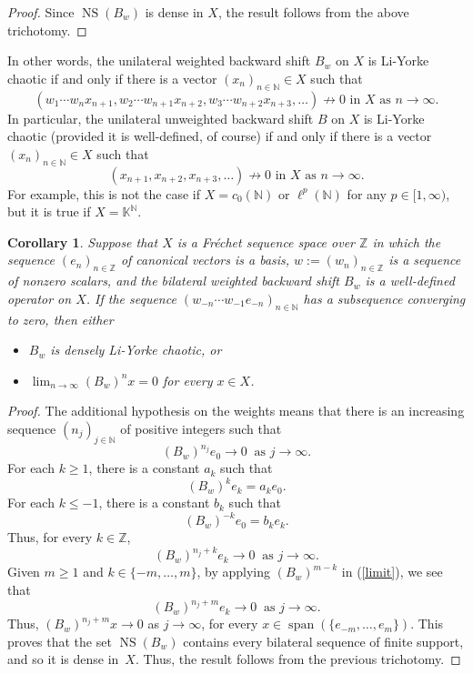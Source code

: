 \documentclass[12pt]{amsart}
\theoremstyle{theorem}
\newtheorem{corollary}[theorem]{Corollary}
\theoremstyle{definition}
\theoremstyle{remark} \theoremstyle{question} \theoremstyle{example}
\newcommand{\N}{\mathbb{N}}
\newcommand{\Z}{\mathbb{Z}}
\newcommand{\K}{\mathbb{K}}
\newcommand{\spa}{\operatorname{span}}
\newcommand{\NS}{\operatorname{NS}}
\begin{document}
\begin{proof}
Since $\NS(B_w)$ is dense in $X$, the result follows from the above trichotomy.
\end{proof}

In other words, the unilateral weighted backward shift $B_w$ on $X$ is Li-Yorke chaotic
if and only if there is a vector $(x_n)_{n \in \N} \in X$ such that
\[
(w_1 \cdots w_n x_{n+1},w_2 \cdots w_{n+1} x_{n+2},w_3 \cdots w_{n+2} x_{n+3},\ldots) \not\to 0 \text{ in } X \text{ as } n \to \infty.
\]
In particular, the unilateral unweighted backward shift $B$ on $X$ is Li-Yorke chaotic (provided it is well-defined, of course)
if and only if there is a vector $(x_n)_{n \in \N} \in X$ such that
\[
(x_{n+1},x_{n+2},x_{n+3},\ldots) \not\to 0 \text{ in } X \text{ as } n \to \infty.
\]
For example, this is not the case if $X = c_0(\N)$ or $\ell^p(\N)$ for any $p \in [1,\infty)$, but it is true if $X = \K^\N$.

\begin{corollary}\label{BWBS}
Suppose that $X$ is a Fr\'echet sequence space over $\Z$ in which the sequence $(e_n)_{n \in \Z}$ of canonical vectors is a basis,
$w\!:= (w_n)_{n \in \Z}$ is a sequence of nonzero scalars, and the bilateral weighted backward shift $B_w$ is a well-defined 
operator on $X$. If the sequence $(w_{-n} \cdots w_{-1} e_{-n})_{n \in \N}$ has a subsequence converging to zero, then either
\begin{itemize}
\item [\rm (a)] $B_w$ is densely Li-Yorke chaotic, or
\item [\rm (b)] $\displaystyle \lim_{n \to \infty} (B_w)^n x = 0$ for every $x \in X$.
\end{itemize}
\end{corollary}

\begin{proof}
The additional hypothesis on the weights means that there is an increasing sequence $(n_j)_{j \in \N}$ of positive integers such that
\[
(B_w)^{n_j}e_0 \to 0 \ \text{ as } j \to \infty.
\]
For each $k \geq 1$, there is a constant $a_k$ such that
\[
(B_w)^k e_k = a_k e_0.
\]
For each $k \leq -1$, there is a constant $b_k$ such that
\[
(B_w)^{-k} e_0 = b_k e_k.
\]
Thus, for every $k \in \Z$,
\begin{equation}
(B_w)^{n_j + k} e_k \to 0 \ \text{ as } j \to \infty.\label{limit}
\end{equation}
Given $m \geq 1$ and $k \in \{-m,\ldots,m\}$, by applying $(B_w)^{m-k}$ in (\ref{limit}), we see that
\[
(B_w)^{n_j + m} e_k \to 0 \ \text{ as } j \to \infty.
\]
Thus, $(B_w)^{n_j + m} x \to 0$ as $j \to \infty$, for every $x \in \spa(\{e_{-m},\ldots,e_m\})$. 
This proves that the set $\NS(B_w)$ contains every bilateral sequence of finite support, and so it is dense in~$X$.
Thus, the result follows from the previous trichotomy.
\end{proof}
\end{document}
